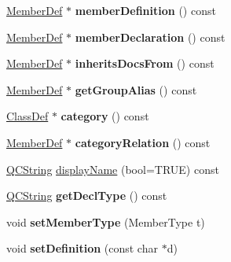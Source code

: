 \begin{DoxyCompactItemize}
\item 
\hypertarget{class_member_def_ae23311b86a005bbaf6b48cb5fe6d336c}{\hyperlink{class_member_def}{Member\-Def} $\ast$ {\bfseries member\-Definition} () const }\label{class_member_def_ae23311b86a005bbaf6b48cb5fe6d336c}

\item 
\hypertarget{class_member_def_aaa1fe9621965d6c30dcdb57e44621fa7}{\hyperlink{class_member_def}{Member\-Def} $\ast$ {\bfseries member\-Declaration} () const }\label{class_member_def_aaa1fe9621965d6c30dcdb57e44621fa7}

\item 
\hypertarget{class_member_def_ac29078d777a4dae21c5f80a0b6215fdd}{\hyperlink{class_member_def}{Member\-Def} $\ast$ {\bfseries inherits\-Docs\-From} () const }\label{class_member_def_ac29078d777a4dae21c5f80a0b6215fdd}

\item 
\hypertarget{class_member_def_a145384ff8ccaa2b0bd298e815886f94b}{\hyperlink{class_member_def}{Member\-Def} $\ast$ {\bfseries get\-Group\-Alias} () const }\label{class_member_def_a145384ff8ccaa2b0bd298e815886f94b}

\item 
\hypertarget{class_member_def_ac2b88776b2be98cd8fe118aff086c31f}{\hyperlink{class_class_def}{Class\-Def} $\ast$ {\bfseries category} () const }\label{class_member_def_ac2b88776b2be98cd8fe118aff086c31f}

\item 
\hypertarget{class_member_def_a3d77dbe1e3028e6616438976ca3929e5}{\hyperlink{class_member_def}{Member\-Def} $\ast$ {\bfseries category\-Relation} () const }\label{class_member_def_a3d77dbe1e3028e6616438976ca3929e5}

\item 
\hyperlink{class_q_c_string}{Q\-C\-String} \hyperlink{class_member_def_a67d09f414df966d11bbeba6298307bdf}{display\-Name} (bool=T\-R\-U\-E) const 
\item 
\hypertarget{class_member_def_a4c6630ebfdf09320ebc9ee8d87ca91f5}{\hyperlink{class_q_c_string}{Q\-C\-String} {\bfseries get\-Decl\-Type} () const }\label{class_member_def_a4c6630ebfdf09320ebc9ee8d87ca91f5}

\item 
\hypertarget{class_member_def_a758f5b0c542433f8950d5074b782ec94}{void {\bfseries set\-Member\-Type} (Member\-Type t)}\label{class_member_def_a758f5b0c542433f8950d5074b782ec94}

\item 
\hypertarget{class_member_def_a439127b49dfa4c941e255988ac0be428}{void {\bfseries set\-Definition} (const char $\ast$d)}\label{class_member_def_a439127b49dfa4c941e255988ac0be428}


\end{DoxyCompactItemize}
